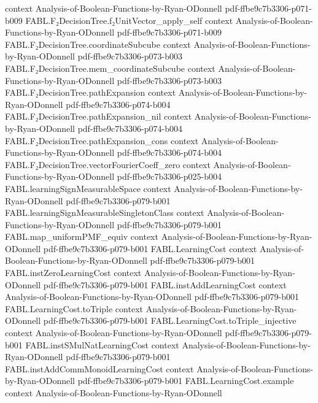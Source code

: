 \begin{theorem}
  {context}
  {Analysis-of-Boolean-Functions-by-Ryan-ODonnell}
  {pdf-ffbe9c7b3306-p071-b009}
\proofstep
  {FABL.F₂DecisionTree.f₂UnitVector_apply_self}
  {context}
  {Analysis-of-Boolean-Functions-by-Ryan-ODonnell}
  {pdf-ffbe9c7b3306-p071-b009}
\proofstep
  {FABL.F₂DecisionTree.coordinateSubcube}
  {context}
  {Analysis-of-Boolean-Functions-by-Ryan-ODonnell}
  {pdf-ffbe9c7b3306-p073-b003}
\proofstep
  {FABL.F₂DecisionTree.mem_coordinateSubcube}
  {context}
  {Analysis-of-Boolean-Functions-by-Ryan-ODonnell}
  {pdf-ffbe9c7b3306-p073-b003}
\proofstep
  {FABL.F₂DecisionTree.pathExpansion}
  {context}
  {Analysis-of-Boolean-Functions-by-Ryan-ODonnell}
  {pdf-ffbe9c7b3306-p074-b004}
\proofstep
  {FABL.F₂DecisionTree.pathExpansion_nil}
  {context}
  {Analysis-of-Boolean-Functions-by-Ryan-ODonnell}
  {pdf-ffbe9c7b3306-p074-b004}
\proofstep
  {FABL.F₂DecisionTree.pathExpansion_cons}
  {context}
  {Analysis-of-Boolean-Functions-by-Ryan-ODonnell}
  {pdf-ffbe9c7b3306-p074-b004}
\proofstep
  {FABL.F₂DecisionTree.vectorFourierCoeff_zero}
  {context}
  {Analysis-of-Boolean-Functions-by-Ryan-ODonnell}
  {pdf-ffbe9c7b3306-p025-b004}
\proofstep
  {FABL.learningSignMeasurableSpace}
  {context}
  {Analysis-of-Boolean-Functions-by-Ryan-ODonnell}
  {pdf-ffbe9c7b3306-p079-b001}
\proofstep
  {FABL.learningSignMeasurableSingletonClass}
  {context}
  {Analysis-of-Boolean-Functions-by-Ryan-ODonnell}
  {pdf-ffbe9c7b3306-p079-b001}
\proofstep
  {FABL.map_uniformPMF_equiv}
  {context}
  {Analysis-of-Boolean-Functions-by-Ryan-ODonnell}
  {pdf-ffbe9c7b3306-p079-b001}
\proofstep
  {FABL.LearningCost}
  {context}
  {Analysis-of-Boolean-Functions-by-Ryan-ODonnell}
  {pdf-ffbe9c7b3306-p079-b001}
\proofstep
  {FABL.instZeroLearningCost}
  {context}
  {Analysis-of-Boolean-Functions-by-Ryan-ODonnell}
  {pdf-ffbe9c7b3306-p079-b001}
\proofstep
  {FABL.instAddLearningCost}
  {context}
  {Analysis-of-Boolean-Functions-by-Ryan-ODonnell}
  {pdf-ffbe9c7b3306-p079-b001}
\proofstep
  {FABL.LearningCost.toTriple}
  {context}
  {Analysis-of-Boolean-Functions-by-Ryan-ODonnell}
  {pdf-ffbe9c7b3306-p079-b001}
\proofstep
  {FABL.LearningCost.toTriple_injective}
  {context}
  {Analysis-of-Boolean-Functions-by-Ryan-ODonnell}
  {pdf-ffbe9c7b3306-p079-b001}
\proofstep
  {FABL.instSMulNatLearningCost}
  {context}
  {Analysis-of-Boolean-Functions-by-Ryan-ODonnell}
  {pdf-ffbe9c7b3306-p079-b001}
\proofstep
  {FABL.instAddCommMonoidLearningCost}
  {context}
  {Analysis-of-Boolean-Functions-by-Ryan-ODonnell}
  {pdf-ffbe9c7b3306-p079-b001}
\proofstep
  {FABL.LearningCost.example}
  {context}
  {Analysis-of-Boolean-Functions-by-Ryan-ODonnell}

\end{theorem}
